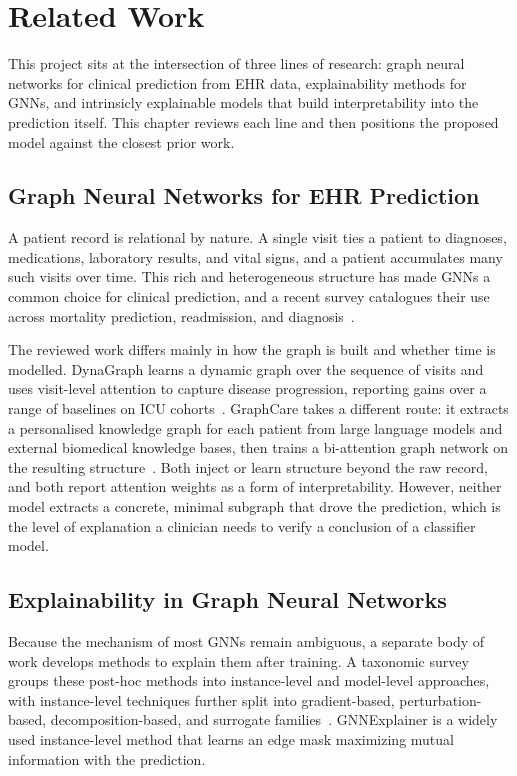 \chapter{Related Work}\label{relatedwork}

This project sits at the intersection of three lines of research: graph neural
networks for clinical prediction from EHR data, explainability methods for GNNs,
and intrinsicly explainable models that build interpretability into the prediction itself. This chapter reviews each line and then positions the proposed model
against the closest prior work.

\section{Graph Neural Networks for EHR Prediction}

A patient record is relational by nature. A single visit ties a patient to
diagnoses, medications, laboratory results, and vital signs, and a patient
accumulates many such visits over time. This rich and heterogeneous structure has made GNNs a common
choice for clinical prediction, and a recent survey catalogues their use across
mortality prediction, readmission, and diagnosis~\cite{ossboll2024gnn}.

The reviewed work differs mainly in how the graph is built and whether time is
modelled. DynaGraph learns a dynamic graph over the sequence of visits and uses
visit-level attention to capture disease progression, reporting gains over a
range of baselines on ICU cohorts~\cite{mesinovic2026dynagraph}. GraphCare takes
a different route: it extracts a personalised knowledge graph for each patient
from large language models and external biomedical knowledge bases, then trains
a bi-attention graph network on the resulting structure~\cite{jiang2024graphcare}.
Both inject or learn structure beyond the raw record, and both report attention
weights as a form of interpretability. However, neither model extracts a concrete, minimal subgraph that drove the prediction, which is the level of explanation a clinician needs to verify a conclusion of a classifier model. 

\section{Explainability in Graph Neural Networks}

Because the mechanism of most GNNs remain ambiguous, a separate body of work develops methods to
explain them after training. A taxonomic survey groups these post-hoc methods
into instance-level and model-level approaches, with instance-level techniques further split into gradient-based, perturbation-based, decomposition-based, and surrogate families~\cite{yuan2022explainability}. GNNExplainer is a widely used instance-level method that learns an edge mask maximizing mutual information
with the prediction.

